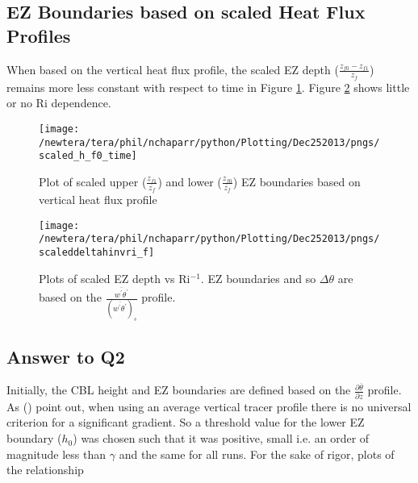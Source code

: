 \clearpage

\subsection{\acs{EZ} Boundaries based on scaled Heat Flux Profiles}
\label{susec:fluxbound}
When based on the vertical heat flux profile, the scaled \acs{EZ} depth ($\frac{z_{f0}-z_{f1}}{z_{f}}$) remains more less constant with respect to time in Figure \ref{fig:scaledEZlims1}. Figure \ref{fig:deltahinvri_scaled} shows little or no \acs{Ri} dependence. 

\begin{figure}[htbp]
    \centering
\texttt{[image: /newtera/tera/phil/nchaparr/python/Plotting/Dec252013/pngs/scaled\_h\_f0\_time]}              
\caption[Scaled \acs{EZ} Boundaries based on the vertical heat flux profile]{Plot of scaled upper ($\frac{z_{f1}}{z_{f}}$) and lower ($\frac{z_{f0}}{z_{f}}$) \acs{EZ} boundaries based on vertical heat flux profile}
    \label{fig:scaledEZlims1}   %
\end{figure}

\begin{figure}[htbp]
    \centering
    \texttt{[image: /newtera/tera/phil/nchaparr/python/Plotting/Dec252013/pngs/scaleddeltahinvri\_f]}
    \caption[scaled \acs{EZ} depth vs \acs{Ri}$^{-1}$ based on the vertical heat flux profile]{Plots of scaled \acs{EZ} depth vs \acs{Ri}$^{-1}$. \acs{EZ} boundaries and so $\Delta \theta$ are based on the $\frac{\overline{w^{'}\theta^{'}}}{(\overline{w^{'}\theta^{'}})_{s}}$ profile.}
    \label{fig:deltahinvri_scaled}   %
\end{figure}

\clearpage

\subsection{Answer to Q2}

Initially, the \acs{CBL} height and \acs{EZ} boundaries are defined based on the $\frac{\partial \overline{\theta}}{\partial z}$ profile.  As \citeauthor{BrooksFowler2} (\citeyear{BrooksFowler2}) point out, when using an average vertical tracer profile there is no universal criterion for a significant gradient.  So a threshold value for the lower \acs{EZ} boundary ($h_{0}$) was chosen such that it was positive, small i.e. an order of magnitude less than $\gamma$ and the same for all runs.  For the sake of rigor, plots of the relationship

